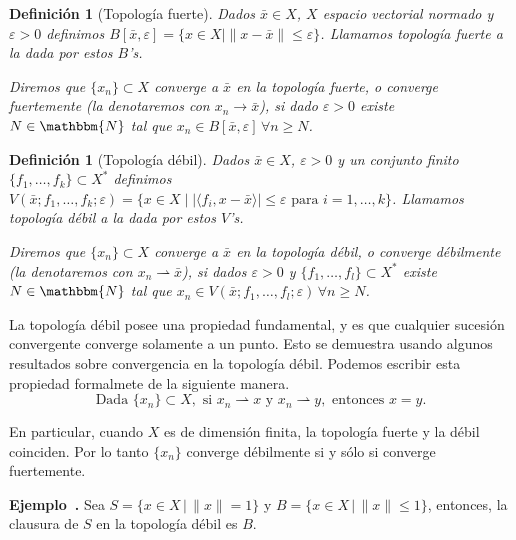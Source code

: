 \documentclass[a4paper,10pt]{book}
\newcommand{\N}{\mathbbm{N}}
\newcommand{\bx}{\bar{x}}
\newcommand{\la}{\langle}
\newcommand{\ra}{\rangle}
\newcommand{\deb}{\rightharpoonup}
\newtheorem{defi}[teo]{Definici\'on}
\newcounter{ejem}[section]
\newenvironment{ejem}[1][]{\refstepcounter{ejem}\par\medskip
   \noindent \textbf{Ejemplo~\theejem. #1} \rmfamily}{\medskip}
\begin{document}
\begin{defi}[Topología fuerte]
Dados $\bx\in X$, $X$ espacio vectorial normado y $\varepsilon>0$ definimos $B[\bx,\varepsilon]=\{x\in X \mid \|x-\bx\|\leq\varepsilon\}$. Llamamos topología fuerte a la dada por estos $B$'s.

Diremos que $\{x_n\}\subset X$ converge a $\bx$ en la topología fuerte, o converge fuertemente (la denotaremos con $x_n\to \bx$), si dado $\varepsilon>0$ existe $N\in \N$ tal que $x_n\in B[\bx,\varepsilon]\,\forall n\geq N$.
\end{defi}


\begin{defi}[Topología débil]
Dados $\bx\in X$, $\varepsilon>0$ y un conjunto finito $\{f_1,\ldots,f_k\}\subset X^*$ definimos $V(\bx;f_1,\ldots,f_k;\varepsilon)=\{x\in X \mid |\la f_i , x-\bx\ra|\leq\varepsilon\mbox{ para }i=1,\ldots,k\}$. Llamamos topología débil a la dada por estos $V$'s.

Diremos que $\{x_n\}\subset X$ converge a $\bx$ en la topología débil, o converge débilmente (la denotaremos con $x_n\deb \bx$), si dados $\varepsilon>0$ y $\{f_1,\ldots,f_l\}\subset X^*$ existe $N\in \N$ tal que $x_n\in V(\bx;f_1,\ldots,f_l;\varepsilon)\,\forall n\geq N$.
\end{defi}

La topología débil posee una propiedad fundamental, y es que cualquier sucesión convergente converge solamente a un punto. Esto se demuestra usando algunos resultados sobre convergencia en la topología débil. Podemos escribir esta propiedad formalmete de la siguiente manera. $$\mbox{Dada } \{x_n\}\subset X, \mbox{ si } x_n\deb x \mbox{ y }x_n\deb y, \mbox{ entonces } x=y.$$

En particular, cuando $X$ es de dimensión finita, la topología fuerte y la débil coinciden. Por lo tanto $\{x_n\}$ converge débilmente si y sólo si converge fuertemente.



\begin{ejem}
Sea $S=\{x\in X\,|\, \|x\|=1\}$ y $B=\{x\in X\,|\,\|x\|\leq1\}$, entonces, la clausura de $S$ en la topología débil es $B$.
\end{ejem}
\end{document}
